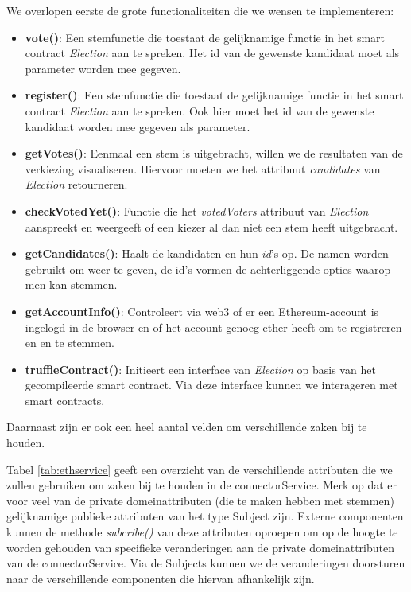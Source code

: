 	We overlopen eerste de grote functionaliteiten die we wensen te implementeren:
	\begin{itemize}
		\item \textbf{vote()}: Een stemfunctie die toestaat de gelijknamige functie in het smart contract \textit{Election} aan te spreken. Het id van de gewenste kandidaat moet als parameter worden mee gegeven.
		\item \textbf{register()}: Een stemfunctie die toestaat  de gelijknamige functie in het smart contract \textit{Election} aan te spreken. Ook hier moet het id van de gewenste kandidaat worden mee gegeven als parameter.
		\item \textbf{getVotes()}: Eenmaal een stem is uitgebracht, willen we de resultaten van de verkiezing visualiseren. Hiervoor moeten we het attribuut \textit{candidates} van \textit{Election} retourneren.
		\item \textbf{checkVotedYet()}: Functie die het \textit{votedVoters} attribuut van \textit{Election} aanspreekt en weergeeft of een kiezer al dan niet een stem heeft uitgebracht.
		\item \textbf{getCandidates()}: Haalt de kandidaten en hun \textit{id}'s op. De namen worden gebruikt om weer te geven, de id's vormen de achterliggende opties waarop men kan stemmen.
		\item \textbf{getAccountInfo()}: Controleert via web3 of er een Ethereum-account is ingelogd in de browser en of het account genoeg ether heeft om te registreren en en te stemmen.
		\item \textbf{truffleContract()}: Initieert een interface van \textit{Election} op basis van het gecompileerde smart contract. Via deze interface kunnen we  interageren met smart contracts.
	\end{itemize}

Daarnaast zijn er ook een heel aantal velden om verschillende zaken bij te houden. 

Tabel \ref{tab:ethservice} geeft een overzicht van de verschillende attributen die we zullen gebruiken om zaken bij te houden in de connectorService. 
Merk op dat er voor veel van de private domeinattributen (die te maken hebben met stemmen) gelijknamige publieke attributen van het type Subject zijn. Externe componenten kunnen de methode \textit{subcribe()} van deze attributen oproepen  om op de hoogte te worden gehouden van specifieke veranderingen aan de private domeinattributen van de connectorService. Via de Subjects kunnen we de veranderingen doorsturen naar de verschillende componenten die hiervan afhankelijk zijn.

